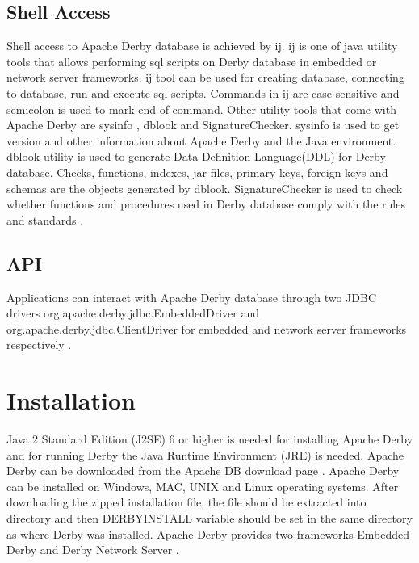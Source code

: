 \documentclass[9pt,twocolumn,twoside]{../../styles/osajnl}
\begin{document}
\subsection{Shell Access}

Shell access to Apache Derby database is achieved by ij. ij is one of
java utility tools that allows performing sql scripts on Derby
database in embedded or network server frameworks. ij tool can be used
for creating database, connecting to database, run and execute sql
scripts.  Commands in ij are case sensitive and semicolon is used to
mark end of command.  Other utility tools that come with Apache Derby
are sysinfo , dblook and SignatureChecker. sysinfo is used to get
version and other information about Apache Derby and the Java
environment. dblook utility is used to generate Data Definition
Language(DDL) for Derby database. Checks, functions, indexes, jar
files, primary keys, foreign keys and schemas are the objects
generated by dblook.  SignatureChecker is used to check whether
functions and procedures used in Derby database comply with the rules
and standards \cite{www-derbyutil}.

\subsection{API}

Applications can interact with Apache Derby database through two JDBC
drivers org.apache.derby.jdbc.EmbeddedDriver and
org.apache.derby.jdbc.ClientDriver for embedded and network server
frameworks respectively \cite{www-derbyutil}.



\section {Installation}

Java 2 Standard Edition (J2SE) 6 or higher is needed for installing
Apache Derby and for running Derby the Java Runtime Environment (JRE)
is needed. Apache Derby can be downloaded from the Apache DB download
page \cite {www-derbydownload}. Apache Derby can be installed on
Windows, MAC, UNIX and Linux operating systems. After downloading the
zipped installation file, the file should be extracted into directory
and then DERBY\textunderscore INSTALL variable should be set in the
same directory as where Derby was installed. Apache Derby provides two
frameworks Embedded Derby and Derby Network Server \cite
{www-derbytutorial}.
\end{document}

